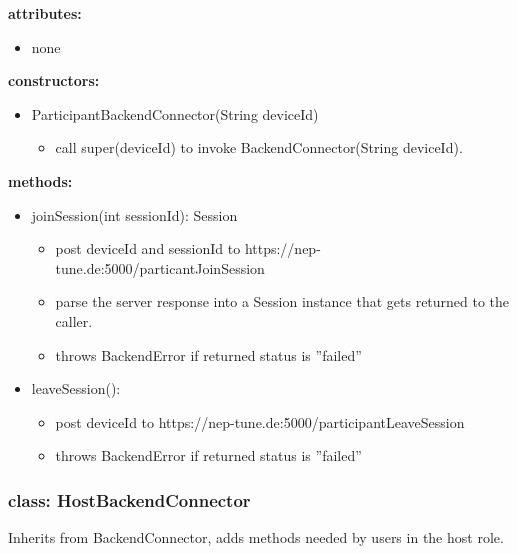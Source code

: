 \documentclass[oneside, ngerman]{sdqtechreport}
\begin{document}
\textbf{attributes:}
\begin{itemize}
     \item none
\end{itemize}
\textbf{constructors:}
\begin{itemize}
    \item ParticipantBackendConnector(String deviceId)
    \begin{itemize}
        \item call super(deviceId) to invoke BackendConnector(String deviceId).
    \end{itemize}
\end{itemize}
\textbf{methods:}
\begin{itemize}
    \item joinSession(int sessionId): Session
    \begin{itemize}
          \item post deviceId and sessionId to https://nep-tune.de:5000/particantJoinSession
          \item parse the server response into a Session instance that gets returned to the caller.
         \item throws BackendError if returned status is ''failed''
     \end{itemize}
     \item leaveSession():
     \begin{itemize}
         \item post deviceId to https://nep-tune.de:5000/participantLeaveSession
         \item throws BackendError if returned status is ''failed''
     \end{itemize}
\end{itemize}

\subsubsection{class: HostBackendConnector}
Inherits from BackendConnector, adds methods needed by users in the host role.
\end{document}
